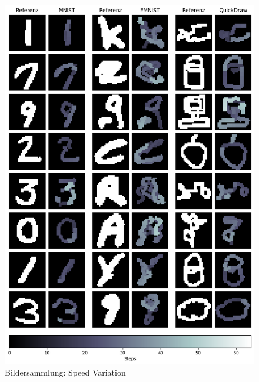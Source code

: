 \begin{figure}[!ht]
    \centering
    \includegraphics[width=\textwidth]{images/resultate/speed.png}
    \caption{Bildersammlung: Speed Variation}\label{fig:r-speed}
\end{figure}

